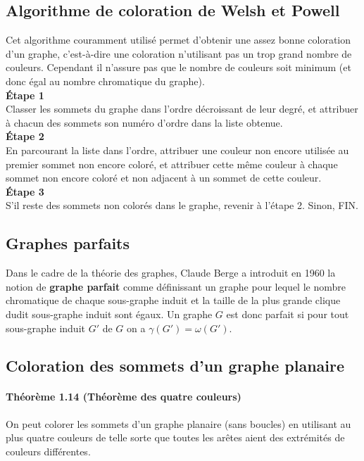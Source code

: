 \subsection*{Algorithme de coloration de Welsh et Powell}
\noindent Cet algorithme couramment utilisé permet d'obtenir une assez bonne coloration d'un
graphe, c'est-à-dire une coloration n'utilisant pas un trop grand nombre de couleurs.
Cependant il n'assure pas que le nombre de couleurs soit minimum (et donc égal au nombre
chromatique du graphe).\\
\textbf{Étape 1}\\
Classer les sommets du graphe dans l'ordre décroissant de leur degré, et attribuer à chacun
des sommets son numéro d'ordre dans la liste obtenue.\\
\textbf{Étape 2}  \\
En parcourant la liste dans l'ordre, attribuer une couleur non encore utilisée au premier
sommet non encore coloré, et attribuer cette même couleur à chaque sommet non encore
coloré et non adjacent à un sommet de cette couleur.\\
\textbf{ Étape 3}  \\
S'il reste des sommets non colorés dans le graphe, revenir à l'étape 2. Sinon, FIN.

\subsection*{Graphes parfaits}
\noindent Dans le cadre de la théorie des graphes, Claude Berge a introduit en 1960 la notion de
\textbf{graphe parfait} comme définissant un graphe pour lequel le nombre chromatique de chaque
sous-graphe induit et la taille de la plus grande clique dudit sous-graphe induit sont égaux.
Un graphe $ G $ est donc parfait si pour tout sous-graphe induit $ G' $ de $ G $ on a $ \gamma (G' ) = \omega (G' ) $.

\subsection*{Coloration des sommets d'un graphe planaire}
\paragraph*{Théorème 1.14 (Théorème des quatre couleurs)}
On peut colorer les sommets d'un graphe planaire (sans boucles) en utilisant au plus
quatre couleurs de telle sorte que toutes les arêtes aient des extrémités de couleurs
différentes.

